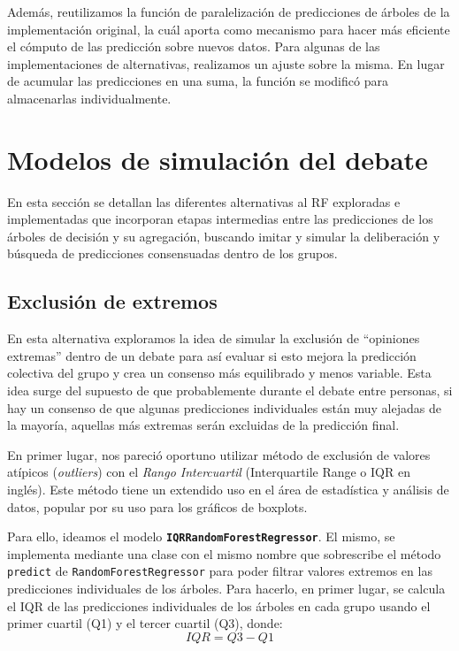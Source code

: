 Además, reutilizamos la función de paralelización de predicciones de árboles de la implementación original, la cuál aporta como mecanismo para hacer más eficiente el cómputo de las predicción sobre nuevos datos. Para algunas de las implementaciones de alternativas, realizamos un ajuste sobre la misma. En lugar de acumular las predicciones en una suma, la función se modificó para almacenarlas individualmente.

\section{Modelos de simulación del debate}

En esta sección se detallan las diferentes alternativas al RF exploradas e implementadas que incorporan etapas intermedias entre las predicciones de los árboles de decisión y su agregación, buscando imitar y simular la deliberación y búsqueda de predicciones consensuadas dentro de los grupos.

\subsection{Exclusión de extremos}

En esta alternativa exploramos la idea de simular la exclusión de “opiniones extremas” dentro de un debate para así evaluar si esto mejora la predicción colectiva del grupo y crea un consenso más equilibrado y menos variable.  Esta idea surge del supuesto de que probablemente durante el debate entre personas, si hay un consenso de que algunas predicciones individuales están muy alejadas de la mayoría, aquellas más extremas serán excluidas de la predicción final. 

En primer lugar, nos pareció oportuno utilizar método de exclusión de valores atípicos (\textit{outliers}) con el \textit{Rango Intercuartil} (Interquartile Range o IQR en inglés). Este método tiene un extendido uso en el área de estadística y análisis de datos, popular  por su uso para los gráficos de boxplots.

Para ello, ideamos el modelo \textbf{\texttt{IQRRandomForestRegressor}}. El mismo, se implementa mediante una clase con el mismo nombre que sobrescribe el método \texttt{predict} de \texttt{RandomForestRegressor} para poder filtrar valores extremos en las predicciones individuales de los árboles. Para hacerlo, en primer lugar, se calcula el IQR de las predicciones individuales de los árboles en cada grupo usando el primer cuartil (Q1) y el tercer cuartil (Q3), donde:
\[
IQR = Q3 - Q1
\]

